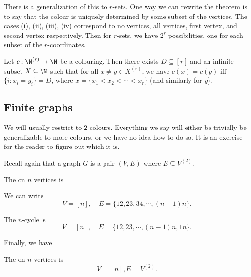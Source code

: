 \documentclass[a4paper]{article}
\begin{document}
There is a generalization of this to $r$-sets. One way we can rewrite the theorem is to say that the colour is uniquely determined by some subset of the vertices. The cases (i), (ii), (iii), (iv) correspond to no vertices, all vertices, first vertex, and second vertex respectively. Then for $r$-sets, we have $2^r$ possibilities, one for each subset of the $r$-coordinates.

\begin{thm}
  Let $c: \N^{(r)} \to \N$ be a colouring. Then there exists $D \subseteq [r]$ and an infinite subset $X \subseteq \N$ such that for all $x \not= y \in X^{(r)}$, we have $c(x) = c(y)$ iff $\{i: x_i = y_i\} = D$, where $x = \{x_1 < x_2 < \cdots < x_r\}$ (and similarly for $y$).
\end{thm}

\subsection{Finite graphs}
We will usually restrict to $2$ colours. Everything we say will either be trivially be generalizable to more colours, or we have no idea how to do so. It is an exercise for the reader to figure out which it is.

Recall again that a graph $G$ is a pair $(V, E)$ where $E \subseteq V^{(2)}$.
\begin{eg}
  The  on $n$ vertices  is
  \begin{center}
  \end{center}
  We can write
  \[
    V = [n],\quad E = \{12, 23, 34, \cdots, (n-1)n\}.
  \]
\end{eg}

\begin{eg}
  The $n$-cycle  is
  \[
    V = [n],\quad E = \{12, 23, \cdots, (n-1)n, 1n\}.
  \]
\end{eg}

Finally, we have
\begin{eg}
  The   on $n$ vertices is
  \[
    V = [n], E = V^{(2)}.
  \]
\end{eg}
\end{document}
